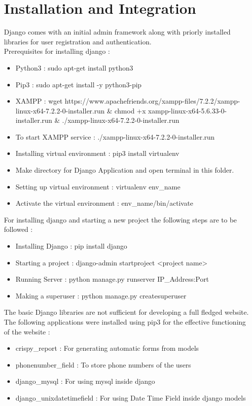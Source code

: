 \section{Installation and Integration}
{\normalsize Django comes with an initial admin framework along with priorly installed libraries for user registration and authentication.\\ 

Prerequisites for installing django : 
\begin{itemize}
    \item Python3 :  sudo apt-get install python3
    \item Pip3 : sudo apt-get install -y python3-pip
    \item XAMPP : wget https://www.apachefriends.org/xampp-files/7.2.2/xampp-linux-x64-7.2.2-0-installer.run \& chmod +x xampp-linux-x64-5.6.33-0-installer.run \& ./xampp-linux-x64-7.2.2-0-installer.run
    \item To start XAMPP service : ./xampp-linux-x64-7.2.2-0-installer.run
    \item Installing virtual environment : pip3 install virtualenv
    \item Make directory for Django Application and open terminal in this folder.
    \item Setting up virtual environment : virtualenv env\_name 
    \item Activate the virtual environment : env\_name/bin/activate
\end{itemize}

For installing django and starting a new project the following steps are to be followed : 

\begin{itemize}
    \item Installing Django : pip install django
    \item Starting a project : django-admin startproject <project name>
    \item Running Server : python manage.py runserver IP\_Address:Port
    \item Making a superuser : python manage.py createsuperuser
\end{itemize}

The basic Django libraries are not sufficient for developing a full fledged website. The following applications were installed using pip3 for the effective functioning of the website : 
\begin{itemize}
    \item crispy\_report : For generating automatic forms from models 
    \item phonenumber\_field : To store phone numbers of the users 
    \item django\_mysql : For using mysql inside django 
    \item django\_unixdatetimefield : For using Date Time Field inside django models
\end{itemize}
}
